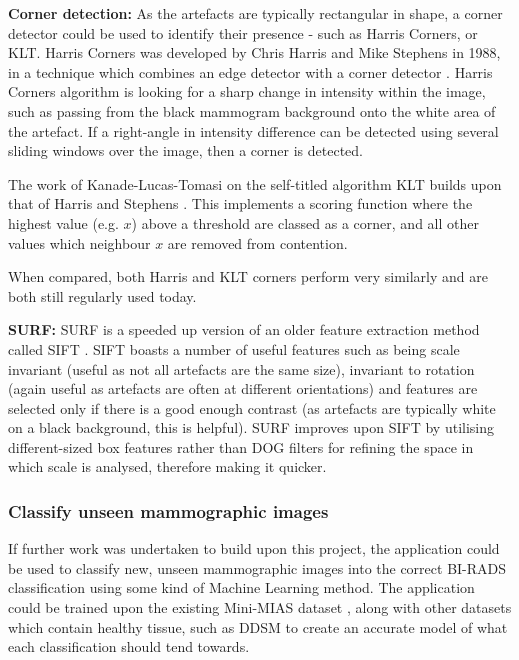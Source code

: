 \noindent \textbf{Corner detection: } As the artefacts are typically rectangular in shape, a corner detector could be used to identify their presence - such as Harris Corners, or KLT. Harris Corners was developed by Chris Harris and Mike Stephens in 1988, in a technique which combines an edge detector with a corner detector \cite{Harris_Stephens_1988}. Harris Corners algorithm is looking for a sharp change in intensity within the image, such as passing from the black mammogram background onto the white area of the artefact. If a right-angle in intensity difference can be detected using several sliding windows over the image, then a corner is detected.

The work of Kanade-Lucas-Tomasi on the self-titled algorithm \acrshort{KLT} builds upon that of Harris and Stephens \cite{Shi_Tomasi_1994} \cite{tomasi2004detection}. This implements a scoring function where the highest value (e.g. $x$) above a threshold are classed as a corner, and all other values which neighbour $x$ are removed from contention.

When compared, both Harris and KLT corners perform very similarly and are both still regularly used today.

\noindent \textbf{SURF: } \acrfull{SURF} \cite{Bay_Tuytelaars_Gool_2006} is a speeded up version of an older feature extraction method called \acrfull{SIFT} \cite{Lowe_1999}. \acrshort{SIFT} boasts a number of useful features such as being scale invariant (useful as not all artefacts are the same size), invariant to rotation (again useful as artefacts are often at different orientations) and features are selected only if there is a good enough contrast (as artefacts are typically white on a black background, this is helpful). \acrshort{SURF} improves upon \acrshort{SIFT} by utilising different-sized box features rather than \acrfull{DOG} filters for refining the space in which scale is analysed, therefore making it quicker.

\subsubsection{Classify unseen mammographic images}

If further work was undertaken to build upon this project, the application could be used to classify new, unseen \gls{mammographic images} into the correct BI-RADS classification using some kind of Machine Learning method. The application could be trained upon the existing Mini-MIAS dataset \cite{Suckling_1994}, along with other datasets which contain healthy tissue, such as \acrshort{DDSM} \cite{Heath_Bowyer_Kopans_Moore_Kegelmeyer_Processing} \cite{Heath_Bowyer_Kopans_Kegelmeyer_Moore_Chang_MunishKumaran_1998} to create an accurate model of what each classification should tend towards.

